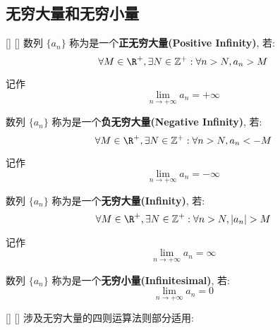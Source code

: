 \documentclass[UTF8]{ctexart}
\begin{document}
		\subsection{无穷大量和无穷小量}
			
			\begin{dfn}
			    []
			    {}
			    []
			    []
				数列 \(\{a_n\}\) 称为是一个\textbf{正无穷大量(Positive Infinity)}, 若: 
				\[\forall M\in\R^+, \exists N\in\mathbb{Z}^+: \forall n>N, a_n>M\]
				
				记作\[\lim_{n\to+\infty}a_n=+\infty\]
				
				数列 \(\{a_n\}\) 称为是一个\textbf{负无穷大量(Negative Infinity)}, 若: 
				\[\forall M\in\R^+, \exists N\in\mathbb{Z}^+: \forall n>N, a_n<-M\]
				
				记作\[\lim_{n\to+\infty}a_n=-\infty\]
				
				数列 \(\{a_n\}\) 称为是一个\textbf{无穷大量(Infinity)}, 若: 
				\[\forall M\in\R^+, \exists N\in\mathbb{Z}^+: \forall n>N, |a_n|>M\]
				
				记作\[\lim_{n\to+\infty}a_n=\infty\]
				
				数列 \(\{a_n\}\) 称为是一个\textbf{无穷小量(Infinitesimal)}, 若: 
				\[\lim_{n\to+\infty}a_n=0\]
			\end{dfn}
			
			\begin{ppt}
			    []
			    {}
			    []
			    []
				涉及无穷大量的四则运算法则部分适用: 
			\end{ppt}
			
\end{document}

